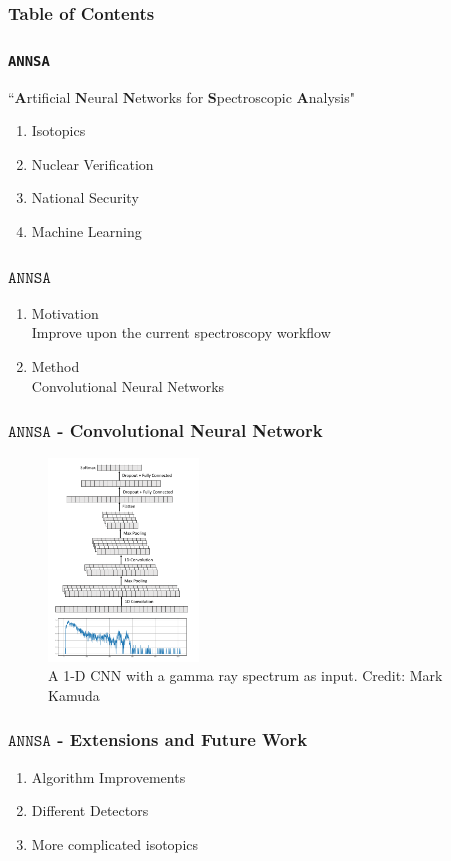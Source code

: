 \graphicspath{{./images/}}

	\begin{frame}
		\frametitle{Table of Contents}
		\tableofcontents
	\end{frame}


	\begin{frame}
		\frametitle{\texttt{ANNSA}}
		``$\textbf{A}$rtificial $\textbf{N}$eural $\textbf{N}$etworks for $\textbf{S}$pectroscopic $\textbf{A}$nalysis"\\
		\begin{enumerate}
			\item Isotopics
			\item Nuclear Verification
			\item National Security 
			\item Machine Learning
		\end{enumerate}
	\end{frame}	
	\begin{frame}
		\frametitle{$\texttt{ANNSA}$}
		\begin{enumerate}
			\item Motivation\\
			Improve upon the current spectroscopy workflow
			\item Method\\
			Convolutional Neural Networks
		\end{enumerate} 
	\end{frame}
	\begin{frame}
		\frametitle{$\texttt{ANNSA}$ - Convolutional Neural Network}
		\begin{figure}
			\includegraphics[width=4cm]{cnn-figure.png}
			\caption{A 1-D CNN with a gamma ray spectrum as input. Credit: Mark Kamuda}
		\end{figure}
	\end{frame}

	\begin{frame}
		\frametitle{$\texttt{ANNSA}$ - Extensions and Future Work}
		\begin{enumerate}
			\item Algorithm Improvements
			\item Different Detectors
			\item More complicated isotopics
		\end{enumerate}
	\end{frame}

